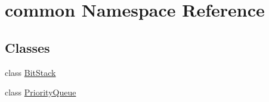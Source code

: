 \hypertarget{namespacecommon}{}\section{common Namespace Reference}
\label{namespacecommon}
\subsection*{Classes}
\begin{DoxyCompactItemize}
\item 
class \hyperlink{classcommon_1_1BitStack}{Bit\+Stack}
\item 
class \hyperlink{classcommon_1_1PriorityQueue}{Priority\+Queue}
\end{DoxyCompactItemize}
